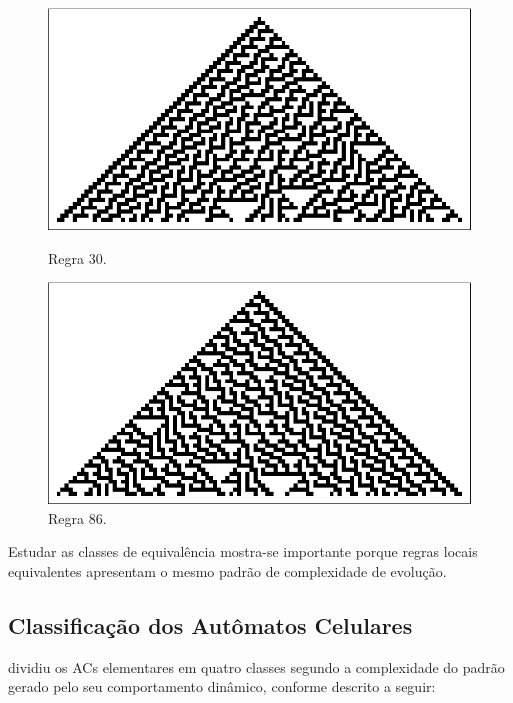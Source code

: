 \documentclass[12pt,a4paper]{article}
\begin{document}
\begin{figure}[ht]
\begin{minipage}[b]{0.5\linewidth}
\centering
\includegraphics[scale=0.85]{img/rule30.eps}
\caption{Regra 30.}
\label{fig:rule30}
\end{minipage}
\hspace{0.5cm}
\begin{minipage}[b]{0.5\linewidth}
\centering
\includegraphics[scale=0.85]{img/rule86.eps}
\caption{Regra 86.}
\label{fig:rule86}
\end{minipage}
\end{figure}

Estudar as classes de equivalência mostra-se importante porque regras locais
equivalentes apresentam o mesmo padrão de complexidade de evolução.

\subsection{Classificação dos Autômatos Celulares}

 dividiu os ACs elementares em quatro
classes segundo a complexidade do padrão gerado pelo seu comportamento dinâmico,
conforme descrito a seguir:
\end{document}
